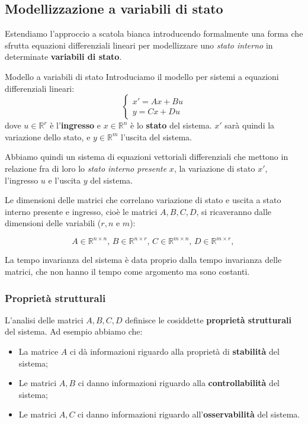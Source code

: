 \documentclass[a4paper,11pt]{article}
\begin{document}
\subsection{Modellizzazione a variabili di stato}
Estendiamo l'approccio a scatola bianca introducendo formalmente una forma che sfrutta equazioni differenziali lineari per modellizzare uno \textit{stato interno} in determinate \textbf{variabili di stato}.

\begin{definition}{Modello a variabili di stato}
	Introduciamo il modello per sistemi a equazioni differenziali lineari:
	\[
		\begin{cases}
			x' = Ax + Bu \\ 
			y = Cx + Du
		\end{cases}
	\]
	dove $u \in \mathbb{R}^r$ è l'\textbf{ingresso} e $x \in \mathbb{R}^n$ è lo \textbf{stato} del sistema.
	$x'$ sarà quindi la variazione dello stato, e $y \in \mathbb{R}^m$ l'uscita del sistema.
\end{definition}

Abbiamo quindi un sistema di equazioni vettoriali differenziali che mettono in relazione fra di loro lo \textit{stato interno presente} $x$, la variazione di stato $x'$, l'ingresso $u$ e l'uscita $y$ del sistema.

Le dimensioni delle matrici che correlano variazione di stato e uscita a stato interno presente e ingresso, cioè le matrici $A, B, C, D$, si ricaveranno dalle dimensioni delle variabili ($r, n$ e $m$):

$$
A \in \mathbb{R}^{n \times n}, \, 
B \in \mathbb{R}^{n \times r}, \, 
C \in \mathbb{R}^{m \times n}, \, 
D \in \mathbb{R}^{m \times r}, \, 
$$

La tempo invarianza del sistema è data proprio dalla tempo invarianza delle matrici, che non hanno il tempo come argomento ma sono costanti.

\subsubsection{Proprietà strutturali}
L'analisi delle matrici $A, B, C, D$ definisce le cosiddette \textbf{proprietà strutturali} del sistema.
Ad esempio abbiamo che:
\begin{itemize}
	\item La matrice $A$ ci dà informazioni riguardo alla proprietà di \textbf{stabilità} del sistema;
	\item Le matrici $A, B$ ci danno informazioni riguardo alla \textbf{controllabilità} del sistema;
	\item Le matrici $A, C$ ci danno informazioni riguardo all'\textbf{osservabilità} del sistema.
\end{itemize}
\end{document}

